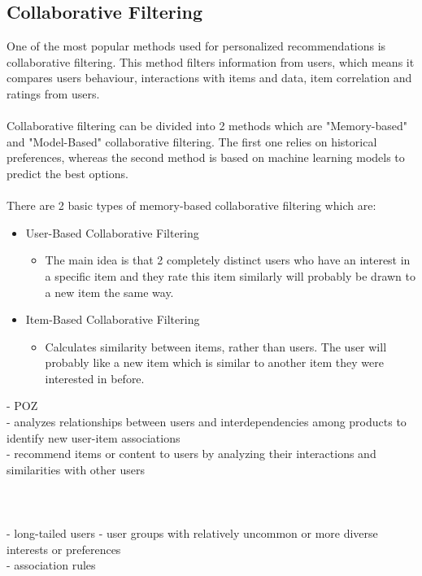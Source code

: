 \documentclass[10pt,oneside,english,a4paper]{article}
\begin{document}
\clearpage
\subsection{Collaborative Filtering}
One of the most popular methods used for personalized recommendations is collaborative filtering. This method filters information from users, which means it compares users behaviour, interactions with items and data, item correlation and ratings from users. \\\\
Collaborative filtering can be divided into 2 methods which are "Memory-based" and "Model-Based" collaborative filtering. The first one relies on historical preferences, whereas the second method is based on machine learning models to predict the best options.\\\\
There are 2 basic types of memory-based collaborative filtering which are:
\begin{itemize}
\item User-Based Collaborative Filtering
	\begin{itemize}
	\item The main idea is that 2 completely distinct users who have an interest in a specific item and they rate this item similarly will probably be drawn to a new item the same way.
	\end{itemize}
\item Item-Based Collaborative Filtering
	\begin{itemize}
	\item Calculates similarity between items, rather than users. The user will probably like a new item which is similar to another item they were interested in before.\\
	\end{itemize}
\end{itemize}
%
%
%
\clearpage{}
- POZ\\
- analyzes relationships between users  and interdependencies among products to identify new user-item associations\\
- recommend items or content to users by analyzing their interactions and similarities with other users\\\\
\cite{5197422}\\\\
%
- long-tailed users - user groups with relatively uncommon or more diverse interests or preferences\\
- association rules\\
\cite{Yan2024}\\\\
\end{document}
